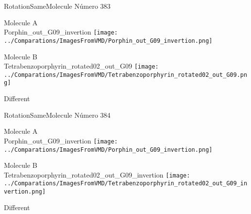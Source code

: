 \vtab[-2cm]
\begin{center}
{\large RotationSameMolecule \tab Número 383}
\end{center}
\begin{multicols}{2}
\begin{center}
Molecule A \\ 
Porphin\_out\_G09\_invertion
\texttt{[image: ../Comparations/ImagesFromVMD/Porphin\_out\_G09\_invertion.png]}
\\
\vtab

\columnbreak
Molecule B \\ 
Tetrabenzoporphyrin\_rotated02\_out\_G09
\texttt{[image: ../Comparations/ImagesFromVMD/Tetrabenzoporphyrin\_rotated02\_out\_G09.png]}
\\
\vtab


\end{center}
\end{multicols}
\begin{center}
\vtab
\vtab
\textcolor{NavyBlue}{\Large Different}
\end{center}

 \newpage

\vtab[-2cm]
\begin{center}
{\large RotationSameMolecule \tab Número 384}
\end{center}
\begin{multicols}{2}
\begin{center}
Molecule A \\ 
Porphin\_out\_G09\_invertion
\texttt{[image: ../Comparations/ImagesFromVMD/Porphin\_out\_G09\_invertion.png]}
\\
\vtab

\columnbreak
Molecule B \\ 
Tetrabenzoporphyrin\_rotated02\_out\_G09\_invertion
\texttt{[image: ../Comparations/ImagesFromVMD/Tetrabenzoporphyrin\_rotated02\_out\_G09\_invertion.png]}
\\
\vtab


\end{center}
\end{multicols}
\begin{center}
\vtab
\vtab
\textcolor{NavyBlue}{\Large Different}
\end{center}

 \newpage

